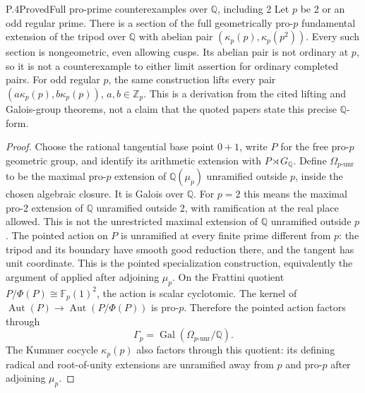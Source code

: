 \begin{result}{P.4}{Proved}{Full pro-prime counterexamples over \(\mathbb Q\), including 2}
Let \(p\) be 2 or an odd regular prime. There is a section of the full
geometrically pro-\(p\) fundamental extension of the tripod over
\(\mathbb Q\) with abelian pair
\((\kappa_p(p),\kappa_p(p^2))\). Every such section is nongeometric,
even allowing cusps. Its abelian pair is not ordinary at \(p\), so it is
not a counterexample to either limit assertion for ordinary completed pairs.
For odd regular \(p\), the same construction lifts every pair
\((a\kappa_p(p),b\kappa_p(p))\), \(a,b\in\mathbb Z_p\).
This is a derivation from the cited lifting and Galois-group theorems, not
a claim that the quoted papers state this precise \(\mathbb Q\)-form.
\end{result}
\begin{proof}
Choose the rational tangential base point \(0+1\), write \(P\) for the
free pro-\(p\) geometric group, and identify its arithmetic extension
with \(P\rtimes G_{\mathbb Q}\). Define \(\Omega_{p\text{-unr}}\)
to be the maximal pro-\(p\) extension of \(\mathbb Q(\mu_p)\)
unramified outside \(p\), inside the chosen algebraic closure. It is
Galois over \(\mathbb Q\). For \(p=2\) this means the maximal
pro-2 extension of \(\mathbb Q\) unramified outside 2, with ramification
at the real place allowed. This is not the unrestricted maximal
extension of \(\mathbb Q\) unramified outside \(p\).
The pointed action on \(P\) is
unramified at every finite prime different from \(p\): the tripod and
its boundary have smooth good reduction there, and the tangent has unit
coordinate. This is the pointed specialization construction, equivalently
the argument of \citet[Lemma 2.2 and its proof, article pp.~8--9]{LitHoshiTsujimura2021}
applied after adjoining \(\mu_p\). On the Frattini quotient
\(P/\Phi(P)\cong\mathbb F_p(1)^2\), the action is scalar
cyclotomic. The kernel of
\(\operatorname{Aut}(P)\to\operatorname{Aut}(P/\Phi(P))\)
is pro-\(p\). Therefore the pointed action factors through
\[
 \Gamma_p=\operatorname{Gal}(\Omega_{p\text{-unr}}/\mathbb Q).
\]
The Kummer cocycle \(\kappa_p(p)\) also factors through this quotient:
its defining radical and root-of-unity extensions are unramified away
from \(p\) and pro-\(p\) after adjoining \(\mu_p\).


\end{proof}
